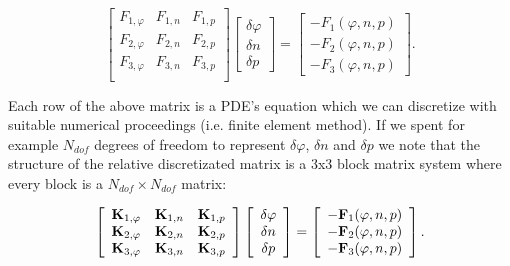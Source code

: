 \begin{equation}
\label{eq: NLP algorithm matrix}
\left[
\begin{array}{ccc}
F_{1,\varphi} & F_{1,n} & F_{1,p} \\
F_{2,\varphi} & F_{2,n} & F_{2,p} \\
F_{3,\varphi} & F_{3,n} & F_{3,p} \\
\end{array}
\right]
\left[
\begin{array}{c}
\delta \varphi  \\
\delta n  \\
\delta p 
\end{array}
\right]
=
\left[
\begin{array}{c}
-F_1(\varphi,n,p) \\
-F_2(\varphi,n,p)\\
-F_3(\varphi,n,p)
\end{array}
\right].
\end{equation}


 Each row of the above matrix is a PDE's equation which we can discretize with suitable numerical proceedings (i.e. finite element method). If we spent for example $N_{dof}$ degrees of freedom to represent $\delta \varphi$, $\delta n$ and $\delta p$ we note that the structure of the relative discretizated matrix is a 3x3 block matrix system where every block is a $N_{dof} \times N_{dof}$ matrix:


\begin{equation}
\left[
\begin{array}{ccc}
\mathbf{K}_{1,\varphi} & \mathbf{K}_{1,n} & \mathbf{K}_{1,p} \\
\mathbf{K}_{2,\varphi} & \mathbf{K}_{2,n} & \mathbf{K}_{2,p} \\
\mathbf{K}_{3,\varphi} & \mathbf{K}_{3,n} & \mathbf{K}_{3,p} \\
\end{array}
\right]
\left[
\begin{array}{c}
\delta \varphi  \\
\delta n  \\
\delta p 
\end{array}
\right]
=
\left[
\begin{array}{c}
-\mathbf{F}_1(\varphi,n,p) \\
-\mathbf{F}_2(\varphi,n,p)\\
-\mathbf{F}_3(\varphi,n,p)
\end{array}
\right].
\end{equation}


